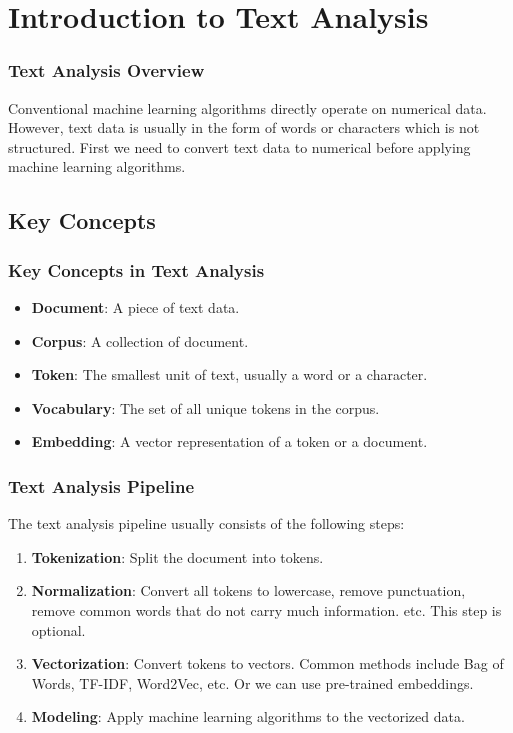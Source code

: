 \documentclass[beamer, en, version=2.0]{huangfusl-template}
\begin{document}
    \section{Introduction to Text Analysis}

    \begin{frame}
        \frametitle{Text Analysis Overview}

        Conventional machine learning algorithms directly operate on numerical data. However, text data is usually in the form of words or characters which is not structured. First we need to convert text data to numerical before applying machine learning algorithms.
    \end{frame}

    \subsection{Key Concepts}

    \begin{frame}
        \frametitle{Key Concepts in Text Analysis}

        \begin{itemize}
            \item \textbf{Document}: A piece of text data.
            \item \textbf{Corpus}: A collection of document.
            \item \textbf{Token}: The smallest unit of text, usually a word or a character.
            \item \textbf{Vocabulary}: The set of all unique tokens in the corpus.
            \item \textbf{Embedding}: A vector representation of a token or a document.
        \end{itemize}
    \end{frame}

    \begin{frame}
        \frametitle{Text Analysis Pipeline}

        The text analysis pipeline usually consists of the following steps:

        \begin{enumerate}
            \item \textbf{Tokenization}: Split the document into tokens.
            \item \textbf{Normalization}: Convert all tokens to lowercase, remove punctuation, remove common words that do not carry much information. etc. This step is optional.
            \item \textbf{Vectorization}: Convert tokens to vectors. Common methods include Bag of Words, TF-IDF, Word2Vec, etc. Or we can use pre-trained embeddings.
            \item \textbf{Modeling}: Apply machine learning algorithms to the vectorized data.
        \end{enumerate}
    \end{frame}
\end{document}
